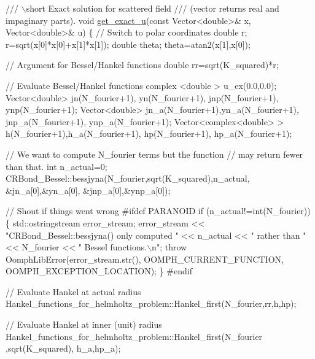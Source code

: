  
\begin{DoxyCodeInclude}
 \textcolor{comment}{/// \(\backslash\)short Exact solution for scattered field }
\textcolor{comment}{ /// (vector returns real and impaginary parts).}
\textcolor{comment}{} \textcolor{keywordtype}{void} \hyperlink{namespaceGlobalParameters_ae2320da6053f5527b2af5ebb362a8a07}{get\_exact\_u}(\textcolor{keyword}{const} Vector<double>& x, Vector<double>& u)
 \{
  \textcolor{comment}{// Switch to polar coordinates}
  \textcolor{keywordtype}{double} r;
  r=sqrt(x[0]*x[0]+x[1]*x[1]);
  \textcolor{keywordtype}{double} theta;
  theta=atan2(x[1],x[0]);
  
  \textcolor{comment}{// Argument for Bessel/Hankel functions}
  \textcolor{keywordtype}{double} rr=sqrt(K\_squared)*r;  
 
  \textcolor{comment}{// Evaluate Bessel/Hankel functions}
  complex <double > u\_ex(0.0,0.0);
  Vector<double> jn(N\_fourier+1), yn(N\_fourier+1),
   jnp(N\_fourier+1), ynp(N\_fourier+1);
  Vector<double> jn\_a(N\_fourier+1),yn\_a(N\_fourier+1),
   jnp\_a(N\_fourier+1), ynp\_a(N\_fourier+1);
  Vector<complex<double> > h(N\_fourier+1),h\_a(N\_fourier+1),
   hp(N\_fourier+1), hp\_a(N\_fourier+1);

  \textcolor{comment}{// We want to compute N\_fourier terms but the function}
  \textcolor{comment}{// may return fewer than that.}
  \textcolor{keywordtype}{int} n\_actual=0;
  CRBond\_Bessel::bessjyna(N\_fourier,sqrt(K\_squared),n\_actual,
                          &jn\_a[0],&yn\_a[0],
                          &jnp\_a[0],&ynp\_a[0]); 

  \textcolor{comment}{// Shout if things went wrong  }
\textcolor{preprocessor}{#ifdef PARANOID}
  \textcolor{keywordflow}{if} (n\_actual!=\textcolor{keywordtype}{int}(N\_fourier))
   \{
    std::ostringstream error\_stream; 
    error\_stream << \textcolor{stringliteral}{"CRBond\_Bessel::bessjyna() only computed "}
                 << n\_actual << \textcolor{stringliteral}{" rather than "} << N\_fourier 
                 << \textcolor{stringliteral}{" Bessel functions.\(\backslash\)n"};    
    \textcolor{keywordflow}{throw} OomphLibError(error\_stream.str(),
                        OOMPH\_CURRENT\_FUNCTION,
                        OOMPH\_EXCEPTION\_LOCATION);
   \}
\textcolor{preprocessor}{#endif}

  \textcolor{comment}{// Evaluate Hankel at actual radius}
  Hankel\_functions\_for\_helmholtz\_problem::Hankel\_first(N\_fourier,rr,h,hp);

  \textcolor{comment}{// Evaluate Hankel at inner (unit) radius}
  Hankel\_functions\_for\_helmholtz\_problem::Hankel\_first(N\_fourier
                                                       ,sqrt(K\_squared),
                                                       h\_a,hp\_a);
  

\end{DoxyCodeInclude}

